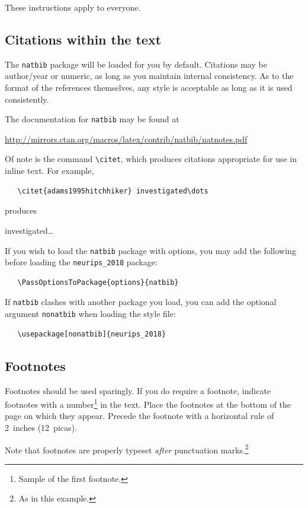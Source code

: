 \documentclass{article}
\begin{document}
These instructions apply to everyone.

\subsection{Citations within the text}

The \verb+natbib+ package will be loaded for you by default.  Citations may be
author/year or numeric, as long as you maintain internal consistency.  As to the
format of the references themselves, any style is acceptable as long as it is
used consistently.

The documentation for \verb+natbib+ may be found at
\begin{center}
  \url{http://mirrors.ctan.org/macros/latex/contrib/natbib/natnotes.pdf}
\end{center}
Of note is the command \verb+\citet+, which produces citations appropriate for
use in inline text.  For example,
\begin{verbatim}
   \citet{adams1995hitchhiker} investigated\dots
\end{verbatim}
produces

  \citet{DBLP:conf/icml/CollobertW08}  investigated\dots


If you wish to load the \verb+natbib+ package with options, you may add the
following before loading the \verb+neurips_2018+ package:
\begin{verbatim}
   \PassOptionsToPackage{options}{natbib}
\end{verbatim}

If \verb+natbib+ clashes with another package you load, you can add the optional
argument \verb+nonatbib+ when loading the style file:
\begin{verbatim}
   \usepackage[nonatbib]{neurips_2018}
\end{verbatim}



\subsection{Footnotes}

Footnotes should be used sparingly.  If you do require a footnote, indicate
footnotes with a number\footnote{Sample of the first footnote.} in the
text. Place the footnotes at the bottom of the page on which they appear.
Precede the footnote with a horizontal rule of 2~inches (12~picas).

Note that footnotes are properly typeset \emph{after} punctuation
marks.\footnote{As in this example.}
\end{document}

